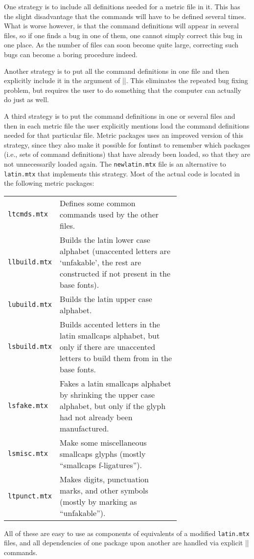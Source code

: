 \documentclass[a4paper]{ltxguide}
\newcommand*{\meta}{\m}
\newcommand*{\setpackagename}[1]{\textsf{#1}}
\newcommand{\fontinst}{\setpackagename{font\-inst}\xspace}
\begin{document}
One strategy is to include all definitions needed for a metric file in 
it. This has the slight disadvantage that the commands will have to be 
defined several times. What is worse however, is that the command 
definitions will appear in several files, so if one finds a bug in one 
of them, one cannot simply correct this bug in one place. As the number 
of files can soon become quite large, correcting such bugs can become 
a boring procedure indeed.

Another strategy is to put all the command definitions in one file 
and then explicitly include it in the \meta{file-list} argument of 
|\installfont|. This eliminates the repeated bug fixing problem, but 
requires the user to do something that the computer can actually do 
just as well.

A third strategy is to put the command definitions in one or several 
files and then in each metric file the user explicitly mentions load 
the command definitions needed for that particular file. Metric 
packages uses an improved version of this strategy, since they also 
make it possible for \fontinst to remember which packages (i.e., sets 
of command definitions) that have already been loaded, so that they 
are not unnecessarily loaded again. The \texttt{newlatin.mtx} file is 
an alternative to \texttt{latin.mtx} that implements this strategy. 
Most of the actual code is located in the following metric packages:
\begin{center}
\begin{tabular}{l p{0.7\linewidth}}
  \texttt{ltcmds.mtx}& Defines some common commands used by the other 
    files.\\
  \texttt{llbuild.mtx}& Builds the latin lower case alphabet 
    (unaccented letters are `unfakable', the rest are constructed if 
    not present in the base fonts).\\
  \texttt{lubuild.mtx}& Builds the latin upper case alphabet.\\
  \texttt{lsbuild.mtx}& Builds accented letters in the latin 
    smallcaps alphabet, but only if there are unaccented letters to 
    build them from in the base fonts.\\
  \texttt{lsfake.mtx}& Fakes a latin smallcaps alphabet by shrinking 
    the upper case alphabet, but only if the glyph had not already 
    been manufactured.\\
  \texttt{lsmisc.mtx}& Make some miscellaneous smallcaps glyphs 
    (mostly ``smallcaps f-ligatures'').\\
  \texttt{ltpunct.mtx}& Makes digits, punctuation marks, and other 
    symbols (mostly by marking as ``unfakable'').
\end{tabular}
\end{center}
\noindent All of these are easy to use as components of equivalents 
of a modified \texttt{latin.mtx} files, and all dependencies of one 
package upon another are handled via explicit |\usemtxpackage| 
commands.
\end{document}

